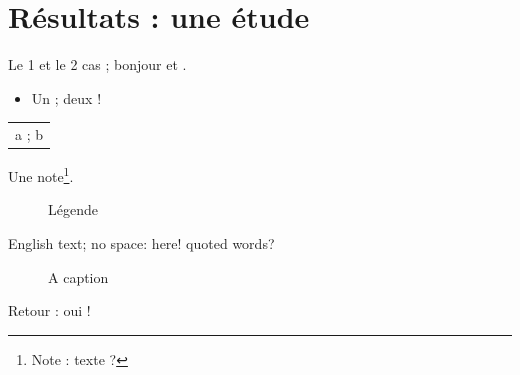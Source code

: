 \documentclass[11pt]{article}
\begin{document}
\section{Résultats : une étude}
Le 1 et le 2\ieme{} cas ; \og bonjour \fg{} et .
\begin{itemize}
\item Un ; deux !
\end{itemize}
\begin{tabular}{l}
a ; b \\
\end{tabular}
Une note\footnote{Note : texte ?}.
\begin{figure}[h]
\caption{Légende}
\end{figure}

\begin{otherlanguage}{english}
English text; no space: here! \og quoted\fg{} words?
\begin{figure}[h]
\caption{A caption}
\end{figure}
\end{otherlanguage}
Retour : oui !
\end{document}

